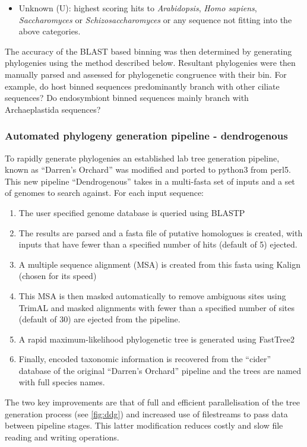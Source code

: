 \begin{itemize}
\item Unknown (U): highest scoring hits to \textit{Arabidopsis}, \textit{Homo sapiens}, \textit{Saccharomyces} or \textit{Schizosaccharomyces} 
    or any sequence not fitting into the above categories.
\end{itemize}

The accuracy of the BLAST based binning was then determined by generating phylogenies
using the method described below. Resultant phylogenies were then manually
parsed and assessed for phylogenetic congruence with their bin.
For example, do host binned sequences predominantly branch with other ciliate sequences?
Do endosymbiont binned sequences mainly branch with Archaeplastida sequences?

\subsubsection{Automated phylogeny generation pipeline - dendrogenous}

To rapidly generate phylogenies an established lab tree generation pipeline, known as ``Darren's Orchard'' 
\citep{Richards2009g} was modified and ported to python3 from perl5.  This new pipeline ``Dendrogenous'' 
takes in a multi-fasta set of inputs and a set of genomes to search against.
For each input sequence:
\begin{enumerate} 
    \item The user specified genome database is queried using BLASTP
    \item The results are parsed and a fasta file of putative homologues is created, with inputs that have fewer than a specified 
        number of hits (default of 5) ejected.
    \item A multiple sequence alignment (MSA) is created from this fasta using Kalign (chosen for its speed) \citep{Lassmann2009}
    \item This MSA is then masked automatically to remove ambiguous sites using TrimAL \citep{Capella-Gutierrez2009} and masked alignments
        with fewer than a specified number of sites (default of 30) are ejected from the pipeline.
    \item A rapid maximum-likelihood phylogenetic tree is generated using FastTree2 \citep{Price2010}
    \item Finally, encoded taxonomic information is recovered from the ``cider'' database of the original ``Darren's Orchard'' pipeline 
        and the trees are named with full species names.
\end{enumerate}
The two key improvements are that of full and efficient parallelisation of the tree generation process (see \cref{fig:ddg})
and increased use of filestreams to pass data between pipeline stages.  This latter modification reduces costly and slow
file reading and writing operations.


